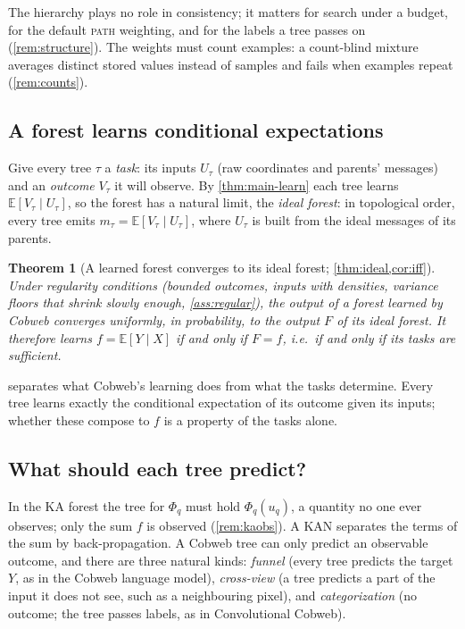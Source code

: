 \documentclass[11pt]{article}
\newtheorem{theorem}{Theorem}
\theoremstyle{definition}
\theoremstyle{remark}
\newcommand{\E}{\mathbb{E}}
\begin{document}
The hierarchy plays no role in consistency; it matters for search under a budget, for
the default \textsc{path} weighting, and for the labels a tree passes on
(\cref{rem:structure}).  The weights must count examples: a count-blind mixture averages
distinct stored values instead of samples and fails when examples repeat
(\cref{rem:counts}).

\subsection{A forest learns conditional expectations}

Give every tree $\tau$ a \emph{task}: its inputs $U_\tau$ (raw coordinates and parents'
messages) and an \emph{outcome} $V_\tau$ it will observe.  By \cref{thm:main-learn} each
tree learns $\E[V_\tau\mid U_\tau]$, so the forest has a natural limit, the \emph{ideal
forest}: in topological order, every tree emits $m_\tau=\E[V_\tau\mid U_\tau]$, where
$U_\tau$ is built from the ideal messages of its parents.

\begin{theorem}[A learned forest converges to its ideal forest;
\cref{thm:ideal,cor:iff}]\label{thm:main-forest}
Under regularity conditions (bounded outcomes, inputs with densities, variance floors
that shrink slowly enough, \cref{ass:regular}), the output of a forest learned by Cobweb
converges uniformly, in probability, to the output $F$ of its ideal forest.  It therefore learns
$f=\E[Y\mid X]$ if and only if $F=f$, i.e.\ if and only if its tasks are
\emph{sufficient}.
\end{theorem}

 separates what Cobweb's learning does from what the tasks
determine.  Every tree learns exactly the conditional expectation of its outcome given
its inputs; whether these compose to $f$ is a property of the tasks alone.

\subsection{What should each tree predict?}\label{sec:tasks-main}

In the KA forest the tree for $\Phi_q$ must hold $\Phi_q(u_q)$, a quantity no one ever
observes; only the sum $f$ is observed (\cref{rem:kaobs}).  A KAN separates the terms of
the sum by back-propagation.  A Cobweb tree can only predict an observable outcome, and
there are three natural kinds:
\emph{funnel} (every tree predicts the target $Y$, as in the Cobweb language model),
\emph{cross-view} (a tree predicts a part of the input it does not see, such as a
neighbouring pixel), and \emph{categorization} (no outcome; the tree passes labels, as in
Convolutional Cobweb).
\end{document}
